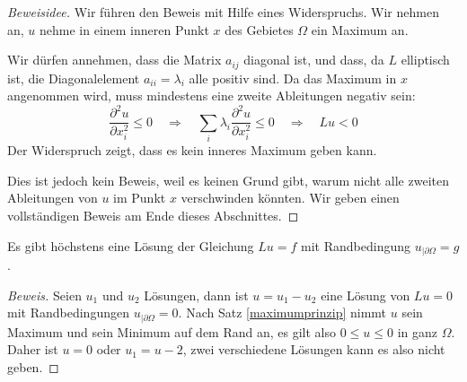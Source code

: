 \begin{proof}[Beweisidee]
Wir führen den Beweis mit Hilfe eines Widerspruchs. Wir nehmen
an, $u$ nehme in einem inneren Punkt $x$ des Gebietes $\Omega$ ein
Maximum an.

Wir dürfen annehmen, dass die Matrix $a_{ij}$ diagonal ist,
und dass,
da $L$ elliptisch ist, die Diagonalelement $a_{ii}=\lambda_i$
alle positiv sind. Da das Maximum in $x$ angenommen wird, muss
mindestens eine zweite Ableitungen negativ sein:
\[
\frac{\partial^2u}{\partial x_i^2}
\le 0
\quad
\Rightarrow
\quad
\sum_{i}\lambda_i \frac{\partial^2u}{\partial x_i^2} \le 0
\quad
\Rightarrow
\quad
Lu<0
\]
Der Widerspruch zeigt, dass es kein inneres Maximum geben kann.

Dies ist jedoch kein Beweis, weil es keinen Grund gibt, warum
nicht alle zweiten Ableitungen von $u$ im Punkt $x$ verschwinden
könnten. Wir geben einen vollständigen Beweis am Ende dieses
Abschnittes.
\end{proof}

\begin{satz}
Es gibt höchstens eine Lösung der Gleichung
$Lu=f$ 
mit Randbedingung
$u_{|\partial\Omega}=g$.
\end{satz}

\begin{proof}[Beweis]
Seien $u_1$ und $u_2$ Lösungen, dann ist $u=u_1-u_2$ eine Lösung 
von $Lu=0$ mit Randbedingungen $u_{|\partial\Omega}=0$. Nach Satz
\ref{maximumprinzip} nimmt $u$ sein Maximum und sein Minimum auf dem Rand an,
es gilt
also $0\le u\le 0$ in ganz $\Omega$.
Daher ist $u=0$ oder $u_1=u-2$,
zwei verschiedene Lösungen kann es also nicht geben.
\end{proof}

